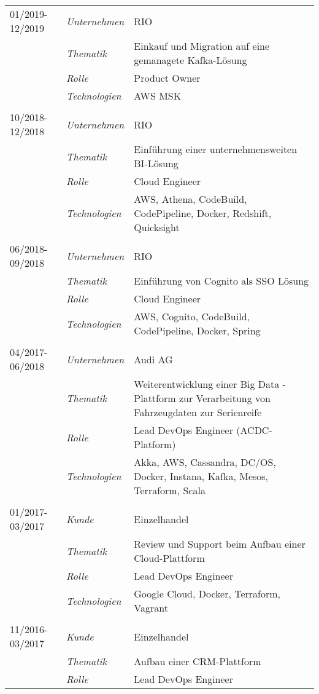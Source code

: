 \begin{longtable}{@{}>{}p{4cm}>{\itshape}p{2cm}>{}p{9cm}}
\\
01/2019-12/2019 & Unternehmen   & RIO\\
\nopagebreak		& Thematik	    & Einkauf und Migration auf eine gemanagete Kafka-Lösung\\
\nopagebreak		& Rolle 	      & Product Owner\\
\nopagebreak		& Technologien	& AWS MSK\\
\\
10/2018-12/2018 & Unternehmen   & RIO\\
\nopagebreak		& Thematik	    & Einführung einer unternehmensweiten BI-Lösung\\
\nopagebreak		& Rolle 	      & Cloud Engineer\\
\nopagebreak		& Technologien	& AWS, Athena, CodeBuild, CodePipeline, Docker, Redshift, Quicksight\\
\\
06/2018-09/2018     & Unternehmen   & RIO\\
\nopagebreak		& Thematik	    & Einführung von Cognito als SSO Lösung\\
\nopagebreak		& Rolle 	    & Cloud Engineer\\
\nopagebreak		& Technologien	& AWS, Cognito, CodeBuild, CodePipeline, Docker, Spring\\
\\
04/2017-06/2018     & Unternehmen   & Audi AG\\
\nopagebreak		& Thematik	    & Weiterentwicklung einer Big Data - Plattform zur Verarbeitung von Fahrzeugdaten zur Serienreife\\
\nopagebreak		& Rolle 	    & Lead DevOps Engineer (ACDC-Platform)\\
\nopagebreak		& Technologien	& Akka, AWS, Cassandra, DC/OS, Docker, Instana, Kafka, Mesos, Terraform, Scala\\
\\
01/2017-03/2017     & Kunde 	    & Einzelhandel\\
\nopagebreak		& Thematik	    & Review und Support beim Aufbau einer Cloud-Plattform\\
\nopagebreak		& Rolle 	    & Lead DevOps Engineer\\
\nopagebreak		& Technologien	& Google Cloud, Docker, Terraform, Vagrant\\
\\
11/2016-03/2017     & Kunde 	    & Einzelhandel\\
\nopagebreak		& Thematik	    & Aufbau einer CRM-Plattform\\
\nopagebreak		& Rolle 	    & Lead DevOps Engineer\\

\end{longtable}
